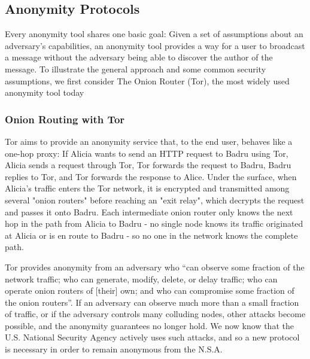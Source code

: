 \subsection{Anonymity Protocols}
\label{subsection:ExistingAnonymity}
  Every anonymity tool shares one basic goal: Given a set of assumptions about
  an adversary's capabilities, an anonymity tool provides a way for a user to
  broadcast a message without the adversary being able to discover the author
  of the message.  To illustrate the general approach and some common
  security assumptions, we first consider The Onion Router (Tor), the most
  widely used anonymity tool today\cite{ford_hiding_2014}

  \subsubsection{Onion Routing with Tor}
    Tor aims to provide an anonymity service that, to the end user, behaves like
    a one-hop proxy: If Alicia wants to send an HTTP request to Badru using Tor,
    Alicia sends a request through Tor, Tor forwards the request to Badru, Badru
    replies to Tor, and Tor forwards the response to Alice. Under the surface,
    when Alicia's traffic enters the Tor network, it is encrypted and
    transmitted among several "onion routers" before reaching an "exit relay",
    which decrypts the request and passes it onto Badru. Each intermediate onion
    router only knows the next hop in the path from Alicia to Badru - no single
    node knows its traffic originated at Alicia or is en route to Badru - so no
    one in the network knows the complete path.

    Tor provides anonymity from an adversary who ``can observe some fraction of
    the network traffic; who can generate, modify, delete, or delay traffic; who
    can operate onion routers of [their] own; and who can compromise some
    fraction of the onion routers''\cite{dingledine_tor:_2004}. If an adversary
    can observe much more than a small fraction of traffic, or if the adversary
    controls many colluding nodes, other attacks become possible, and the
    anonymity guarantees no longer hold. We now know that the U.S. National
    Security Agency actively uses such attacks, and so a new protocol is
    necessary in order to remain anonymous from the N.S.A.

